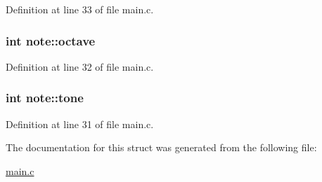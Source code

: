 Definition at line 33 of file main.\+c.

\hypertarget{structnote_a8b58f133e02c3ea4ec40ee641b654dcf}{
\subsubsection[{octave}]{\setlength{\rightskip}{0pt plus 5cm}int note\+::octave}}\label{structnote_a8b58f133e02c3ea4ec40ee641b654dcf}


Definition at line 32 of file main.\+c.

\hypertarget{structnote_a30832d96c968d682e5838b39370a1908}{
\subsubsection[{tone}]{\setlength{\rightskip}{0pt plus 5cm}int note\+::tone}}\label{structnote_a30832d96c968d682e5838b39370a1908}


Definition at line 31 of file main.\+c.



The documentation for this struct was generated from the following file\+:\begin{DoxyCompactItemize}
\item 
\hyperlink{main_8c}{main.\+c}\end{DoxyCompactItemize}
